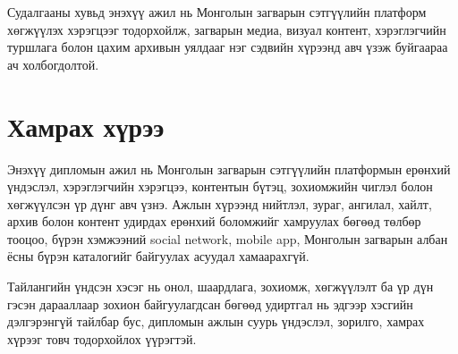 Судалгааны хувьд энэхүү ажил нь Монголын загварын сэтгүүлийн платформ хөгжүүлэх хэрэгцээг тодорхойлж, загварын медиа, визуал контент, хэрэглэгчийн туршлага болон цахим архивын уялдааг нэг сэдвийн хүрээнд авч үзэж буйгаараа ач холбогдолтой.

\section*{Хамрах хүрээ}
Энэхүү дипломын ажил нь Монголын загварын сэтгүүлийн платформын ерөнхий үндэслэл, хэрэглэгчийн хэрэгцээ, контентын бүтэц, зохиомжийн чиглэл болон хөгжүүлсэн үр дүнг авч үзнэ. Ажлын хүрээнд нийтлэл, зураг, ангилал, хайлт, архив болон контент удирдах ерөнхий боломжийг хамруулах бөгөөд төлбөр тооцоо, бүрэн хэмжээний social network, mobile app, Монголын загварын албан ёсны бүрэн каталогийг байгуулах асуудал хамаарахгүй.

Тайлангийн үндсэн хэсэг нь онол, шаардлага, зохиомж, хөгжүүлэлт ба үр дүн гэсэн дарааллаар зохион байгуулагдсан бөгөөд удиртгал нь эдгээр хэсгийн дэлгэрэнгүй тайлбар бус, дипломын ажлын суурь үндэслэл, зорилго, хамрах хүрээг товч тодорхойлох үүрэгтэй.
